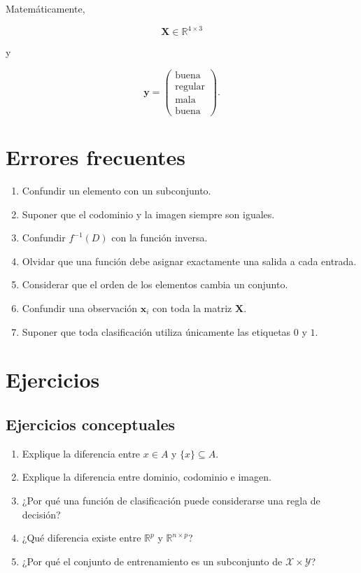 \documentclass[
  spanish,
  11pt,
  letterpaper,
  DIV=11,
  numbers=noendperiod]{scrreprt}
\providecommand{\tightlist}{%
  \setlength{\itemsep}{0pt}\setlength{\parskip}{0pt}}
\theoremstyle{definition}
\theoremstyle{plain}
\theoremstyle{definition}
\theoremstyle{remark}
\begin{document}
Matemáticamente,

\[
\mathbf{X}\in\mathbb{R}^{4\times 3}
\]

y

\[
\mathbf{y}
=
\begin{pmatrix}
\text{buena}\\
\text{regular}\\
\text{mala}\\
\text{buena}
\end{pmatrix}.
\]

\section{Errores frecuentes}\label{errores-frecuentes}

\begin{enumerate}
\def\labelenumi{\arabic{enumi}.}
\tightlist
\item
  Confundir un elemento con un subconjunto.
\item
  Suponer que el codominio y la imagen siempre son iguales.
\item
  Confundir \(f^{-1}(D)\) con la función inversa.
\item
  Olvidar que una función debe asignar exactamente una salida a cada
  entrada.
\item
  Considerar que el orden de los elementos cambia un conjunto.
\item
  Confundir una observación \(\mathbf{x}_i\) con toda la matriz
  \(\mathbf{X}\).
\item
  Suponer que toda clasificación utiliza únicamente las etiquetas \(0\)
  y \(1\).
\end{enumerate}

\section{Ejercicios}\label{ejercicios}

\subsection{Ejercicios conceptuales}\label{ejercicios-conceptuales}

\begin{enumerate}
\def\labelenumi{\arabic{enumi}.}
\tightlist
\item
  Explique la diferencia entre \(x\in A\) y \(\{x\}\subseteq A\).
\item
  Explique la diferencia entre dominio, codominio e imagen.
\item
  ¿Por qué una función de clasificación puede considerarse una regla de
  decisión?
\item
  ¿Qué diferencia existe entre \(\mathbb{R}^{p}\) y
  \(\mathbb{R}^{n\times p}\)?
\item
  ¿Por qué el conjunto de entrenamiento es un subconjunto de
  \(\mathcal{X}\times\mathcal{Y}\)?
\end{enumerate}
\end{document}
